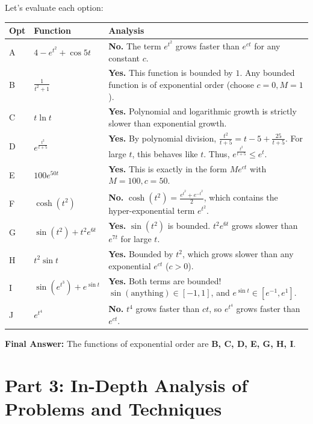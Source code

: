 \documentclass[11pt, a4paper]{article}
\theoremstyle{definition}
\theoremstyle{remark}
\begin{document}
Let's evaluate each option:
\renewcommand{\arraystretch}{1.5}
\begin{center}
\begin{tabularx}{\textwidth}{>{\hsize=0.1\hsize}X >{\hsize=0.3\hsize}X >{\hsize=0.6\hsize}X}
\toprule
\textbf{Opt} & \textbf{Function} & \textbf{Analysis} \\
\midrule
A & $4 - e^{t^2} + \cos 5t$ & \textbf{No.} The term $e^{t^2}$ grows faster than $e^{ct}$ for any constant $c$. \\
\addlinespace[4pt]
B & $\frac{1}{t^2+1}$ & \textbf{Yes.} This function is bounded by $1$. Any bounded function is of exponential order (choose $c=0, M=1$). \\
\addlinespace[4pt]
C & $t \ln t$ & \textbf{Yes.} Polynomial and logarithmic growth is strictly slower than exponential growth. \\
\addlinespace[4pt]
D & $e^{\frac{t^2}{t+5}}$ & \textbf{Yes.} By polynomial division, $\frac{t^2}{t+5} = t - 5 + \frac{25}{t+5}$. For large $t$, this behaves like $t$. Thus, $e^{\frac{t^2}{t+5}} \le e^t$. \\
\addlinespace[4pt]
E & $100 e^{50t}$ & \textbf{Yes.} This is exactly in the form $M e^{ct}$ with $M=100, c=50$. \\
\addlinespace[4pt]
F & $\cosh(t^2)$ & \textbf{No.} $\cosh(t^2) = \frac{e^{t^2} + e^{-t^2}}{2}$, which contains the hyper-exponential term $e^{t^2}$. \\
\addlinespace[4pt]
G & $\sin(t^2) + t^2 e^{6t}$ & \textbf{Yes.} $\sin(t^2)$ is bounded. $t^2 e^{6t}$ grows slower than $e^{7t}$ for large $t$. \\
\addlinespace[4pt]
H & $t^2 \sin t$ & \textbf{Yes.} Bounded by $t^2$, which grows slower than any exponential $e^{ct}$ ($c>0$). \\
\addlinespace[4pt]
I & $\sin(e^{t^3}) + e^{\sin t}$ & \textbf{Yes.} Both terms are bounded! $\sin(\text{anything}) \in [-1,1]$, and $e^{\sin t} \in [e^{-1}, e^1]$. \\
\addlinespace[4pt]
J & $e^{t^4}$ & \textbf{No.} $t^4$ grows faster than $ct$, so $e^{t^4}$ grows faster than $e^{ct}$. \\
\bottomrule
\end{tabularx}
\end{center}

\textbf{Final Answer:} The functions of exponential order are \textbf{B, C, D, E, G, H, I}.

\newpage
\section{Part 3: In-Depth Analysis of Problems and Techniques}
\end{document}
